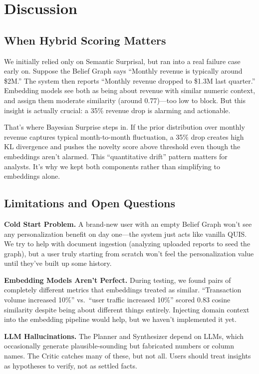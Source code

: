 \documentclass[conference]{IEEEtran}
\begin{document}
\section{Discussion}
\label{sec:discussion}

\subsection{When Hybrid Scoring Matters}

We initially relied only on Semantic Surprisal, but ran into a real
failure case early on. Suppose the Belief Graph says ``Monthly revenue
is typically around \$2M.'' The system then reports ``Monthly revenue
dropped to \$1.3M last quarter.'' Embedding models see both as being
about revenue with similar numeric context, and assign them moderate
similarity (around 0.77)---too low to block. But this insight is
actually crucial: a 35\% revenue drop is alarming and actionable.

That's where Bayesian Surprise steps in. If the prior distribution over
monthly revenue captures typical month-to-month fluctuation, a 35\% drop
creates high KL divergence and pushes the novelty score above threshold
even though the embeddings aren't alarmed. This ``quantitative drift''
pattern matters for analysts. It's why we kept both components rather
than simplifying to embeddings alone.

\subsection{Limitations and Open Questions}

\textbf{Cold Start Problem.} A brand-new user with an empty Belief
Graph won't see any personalization benefit on day one---the system
just acts like vanilla QUIS. We try to help with document ingestion
(analyzing uploaded reports to seed the graph), but a user truly starting
from scratch won't feel the personalization value until they've built
up some history.

\textbf{Embedding Models Aren't Perfect.} During testing, we found pairs
of completely different metrics that embeddings treated as similar.
``Transaction volume increased 10\%'' vs.\ ``user traffic increased
10\%'' scored 0.83 cosine similarity despite being about different
things entirely. Injecting domain context into the embedding pipeline
would help, but we haven't implemented it yet.

\textbf{LLM Hallucinations.} The Planner and Synthesizer depend on LLMs,
which occasionally generate plausible-sounding but fabricated numbers or
column names. The Critic catches many of these, but not all. Users should
treat insights as hypotheses to verify, not as settled facts.
\end{document}
